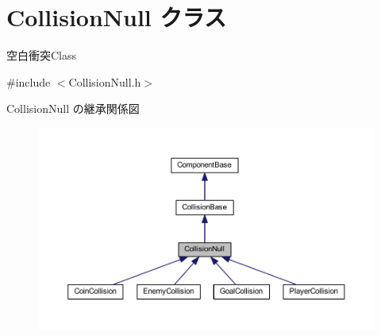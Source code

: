 \hypertarget{class_collision_null}{}\section{Collision\+Null クラス}
\label{class_collision_null}


空白衝突\+Class  




{\ttfamily \#include $<$Collision\+Null.\+h$>$}



Collision\+Null の継承関係図\nopagebreak
\begin{figure}[H]
\begin{center}
\leavevmode
\includegraphics[width=350pt]{class_collision_null__inherit__graph}
\end{center}
\end{figure}
